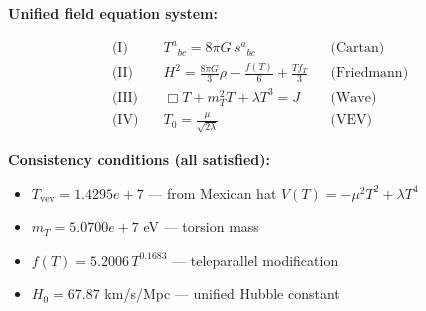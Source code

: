 
\textbf{Unified field equation system:}

\begin{align}
  \text{(I)} \quad & T^a{}_{bc} = 8\pi G \, s^a{}_{bc} && \text{(Cartan)} \\
  \text{(II)} \quad & H^2 = \frac{8\pi G}{3}\rho - \frac{f(T)}{6} + \frac{Tf_T}{3} && \text{(Friedmann)} \\
  \text{(III)} \quad & \Box T + m_T^2 T + \lambda T^3 = J && \text{(Wave)} \\
  \text{(IV)} \quad & T_0 = \frac{\mu}{\sqrt{2\lambda}} && \text{(VEV)}
\end{align}

\textbf{Consistency conditions (all satisfied):}
\begin{itemize}
  \item $T_{\text{vev}} = 1.4295e+7$ — from Mexican hat $V(T) = -\mu^2 T^2 + \lambda T^4$
  \item $m_T = 5.0700e+7$ eV — torsion mass
  \item $f(T) = 5.2006 \, T^{0.1683}$ — teleparallel modification
  \item $H_0 = 67.87$ km/s/Mpc — unified Hubble constant
\end{itemize}